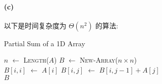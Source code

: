 \documentclass{ctexart}
\newcommand{\Let}[1]{\State #1 $\gets$}
\newcommand{\F}[2]{\textsc{#1}(#2)}
\newcommand{\Ret}[1]{\State \textbf{return} #1}
\begin{document}
\paragraph*{(c)} 以下是时间复杂度为 $\Theta(n^2)$ 的算法:

\begin{algorithm}[ht]
    \caption{Partial Sum of a 1D Array}
    \begin{algorithmic}
        \Let{$n$} \F{Length}{$A$}
        \Let{$B$} \F{New-Array}{$n \times n$}
        \\
            \Let{$B[i, i]$} $A[i]$
                \Let{$B[i, j]$} $B[i, j-1] + A[j]$
            \EndFor
        \EndFor
        \\
        \Ret $B$
        \EndFunction
    \end{algorithmic}
\end{algorithm}
\end{document}
